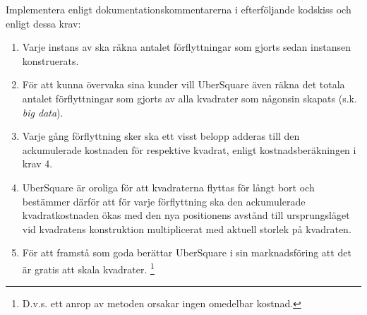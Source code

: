 \Subtask Implementera  enligt dokumentationskommentarerna i efterföljande kodskiss och enligt dessa krav:

\begin{enumerate}%
   \item Varje instans av  ska räkna antalet förflyttningar som gjorts sedan instansen konstruerats.

   \item För att kunna övervaka sina kunder vill UberSquare även räkna det totala antalet förflyttningar som gjorts av alla kvadrater som någonsin skapats (s.k. \emph{big data}).

  \item Varje gång förflyttning sker ska ett visst belopp adderas till den ackumulerade kostnaden för respektive kvadrat, enligt kostnadsberäkningen i krav 4.

  \item UberSquare är oroliga för att kvadraterna flyttas för långt bort och bestämmer därför att för varje förflyttning ska den ackumulerade kvadratkostnaden ökas med den nya positionens avstånd till ursprungsläget vid kvadratens konstruktion multiplicerat med aktuell storlek på kvadraten.

  \item För att framstå som goda berättar UberSquare i sin marknadsföring att det är gratis att skala kvadrater. \footnote{D.v.s. ett anrop av metoden  orsakar ingen omedelbar kostnad.}
\end{enumerate}

